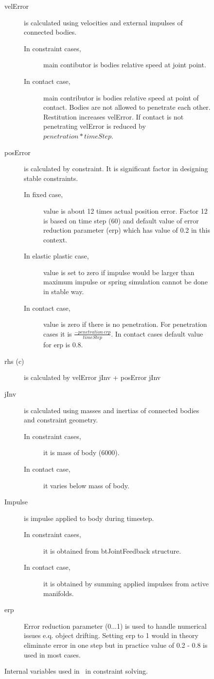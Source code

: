 \begin{figure}[htb!]
\begin{description}
\item[velError] is calculated using velocities and external impulses of connected bodies.  
 \begin{description}
\item[In constraint cases,] main contibutor is bodies relative speed at joint point.
\item[In contact case,] main contributor is bodies relative speed at point of contact. 
Bodies are not allowed to penetrate each other. Restitution increases velError.
If contact is not penetrating velError is reduced by $penetration * timeStep$.
\end{description}
\item[posError] is calculated by constraint. It is significant factor in designing stable constraints.
 \begin{description}
 \item[In fixed case,] value is about 12 times actual position error. Factor 12 is based on time step (60) 
 and default value of error reduction parameter (erp) which has value of 0.2 in this context.
 \item[In elastic plastic case,]  value is set to zero if impulse would be larger than maximum impulse or
spring simulation cannot be done in stable way.
 \item[In contact case,] value is zero if there is no penetration. For penetration cases it is 
$\frac{-penetration\, erp}{timeStep}$. In contact cases default value for erp is 0.8.
 \end{description}
\item[rhs (c)] is calculated by velError jInv + posError jInv
\item[jInv] is calculated using masses and inertias of connected bodies and constraint geometry. 
 \begin{description}
\item[In constraint cases,] it is mass of body (6000).
\item[In contact case,] it varies below mass of body.
\end{description}
\item[Impulse] is impulse applied to body during timestep.
 \begin{description}
\item[In constraint cases,] it is obtained from btJointFeedback structure.
\item[In contact case,] it is obtained by summing applied impulses from active manifolds.
\end{description}
\item[erp] Error reduction parameter (0...1) is used to handle numerical issues e.q. object drifting. 
Setting erp to 1 would in theory eliminate error in one step but in practice value of 0.2 - 0.8 is used in most cases.
\end{description}
\caption{Internal variables used in \bullet\ in constraint solving.}
\label{fig:solVars}
\end{figure}

